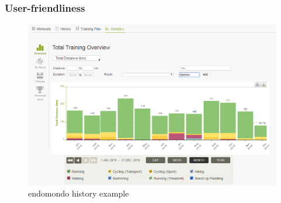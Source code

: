 \subsubsection*{User-friendliness}

\begin{figure}[h]
    \includegraphics[width=\textwidth]{Images/endomondo-history-example.png}
    \caption{endomondo history example\cite{endomondo-history-img}}
\end{figure}

